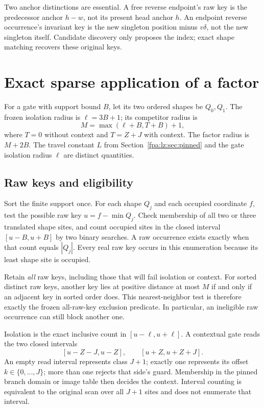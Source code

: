 \documentclass[11pt,a4paper]{article}
\numberwithin{equation}{section}
\begin{document}
Two anchor distinctions are essential. A free reverse endpoint's raw key is the predecessor anchor $h-w$, not its present head anchor $h$. An endpoint reverse occurrence's invariant key is the new singleton position minus $v\delta$, not the new singleton itself. Candidate discovery only proposes the index; exact shape matching recovers these original keys.

\section{Exact sparse application of a factor}\label{fpa:lz:sec:factor}
For a gate with support bound $B$, let its two ordered shapes be $Q_0,Q_1$. The frozen isolation radius is $\ell=3B+1$; its competitor radius is
\[
M=\max(\ell+B,T+B)+1,
\]
where $T=0$ without context and $T=Z+J$ with context. The factor radius is $M+2B$. The travel constant $L$ from Section~\ref{fpa:lz:sec:pinned} and the gate isolation radius $\ell$ are distinct quantities.

\subsection{Raw keys and eligibility}
Sort the finite support once. For each shape $Q_j$ and each occupied coordinate $f$, test the possible raw key $u=f-\min Q_j$. Check membership of all two or three translated shape sites, and count occupied sites in the closed interval $[u-B,u+B]$ by two binary searches. A raw occurrence exists exactly when that count equals $|Q_j|$. Every real raw key occurs in this enumeration because its least shape site is occupied.

Retain \emph{all} raw keys, including those that will fail isolation or context. For sorted distinct raw keys, another key lies at positive distance at most $M$ if and only if an adjacent key in sorted order does. This nearest-neighbor test is therefore exactly the frozen all-raw-key exclusion predicate. In particular, an ineligible raw occurrence can still block another one.

Isolation is the exact inclusive count in $[u-\ell,u+\ell]$. A contextual gate reads the two closed intervals
\[
[u-Z-J,u-Z],\qquad [u+Z,u+Z+J].
\]
An empty read interval represents class $J+1$; exactly one represents its offset $k\in\{0,\ldots,J\}$; more than one rejects that side's guard. Membership in the pinned branch domain or image table then decides the context. Interval counting is equivalent to the original scan over all $J+1$ sites and does not enumerate that interval.
\end{document}
